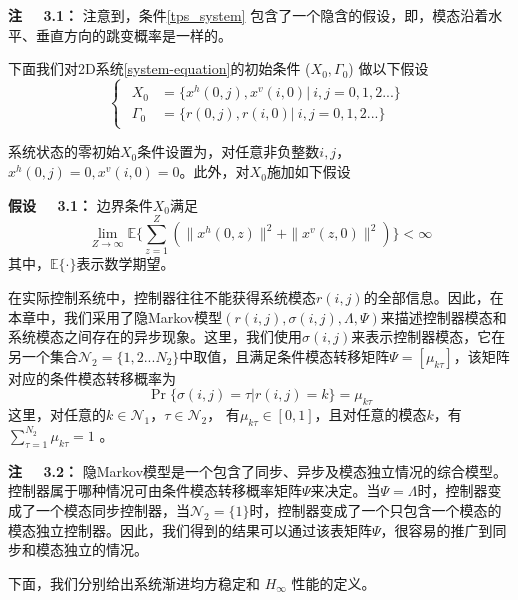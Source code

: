 	{\bf 注 \ \ 3.1：}
	注意到，条件\eqref{tps_system} 包含了一个隐含的假设，即，模态沿着水平、垂直方向的跳变概率是一样的。
	
	下面我们对2D系统\eqref{system-equation}的初始条件 ($X_{0},\varGamma_{0}$) 做以下假设
	\begin{equation} \label{boundary-condition}
	\left\{
	\begin{array}{lr}
	\begin{split}
	X_{0} &= \{x^{h}(0,j),x^{v}(i,0)|\ i,j = 0,1,2...\}\\
	\varGamma_{0} &= \{r(0,j), r(i,0)|\ i,j = 0,1,2... \}
	\end{split}
	\end{array}
	\right.
	\end{equation}
	
	系统状态的零初始$X_0$条件设置为，对任意非负整数$i,j$，$x^{h}(0,j) =0, x^{v}(i,0)=0$。此外，对$X_{0}$施加如下假设
	
	{\bf 假设 \ \ 3.1：}
	边界条件$X_{0}$满足
	\begin{equation}
	\lim\limits_{Z\to\infty}\mathbb{E}\Big\{\sum_{z=1}^{Z}(\|x^{h}(0,z)\|^{2}+ \|x^{v}(z,0)\|^{2})\Big\} < \infty
	\end{equation}
	其中，$\mathbb{E}\{\cdot\}$表示数学期望。
	
	在实际控制系统中，控制器往往不能获得系统模态$r(i,j)$的全部信息。因此，在本章中，我们采用了隐Markov模型$(r(i,j),\sigma(i,j),\varLambda,\varPsi)$来描述控制器模态和系统模态之间存在的异步现象。这里，我们使用$\sigma(i,j)$来表示控制器模态，它在另一个集合$\mathcal{N}_{2} = \{1,2...N_{2}\}$中取值，且满足条件模态转移矩阵$\varPsi=[\mu_{k\tau} ]$，该矩阵对应的条件模态转移概率为
	\begin{equation}
	\Pr\{\sigma(i,j)=\tau|r(i,j)=k\}=\mu_{k\tau } %
	\end{equation}
	这里，对任意的$k\in\mathcal{N}_{1}$，$\tau\in\mathcal{N}_{2}$， 有$\mu_{k\tau }\in[0,1]$，且对任意的模态$k$，有 $\sum_{\tau =1}^{N_{2}}\mu_{k\tau } = 1$ 。
	
	{\bf 注 \ \ 3.2：}
	隐Markov模型是一个包含了同步、异步及模态独立情况的综合模型。控制器属于哪种情况可由条件模态转移概率矩阵$\varPsi$来决定。当$\varPsi=\varLambda$时，控制器变成了一个模态同步控制器，当$\mathcal{N}_{2}=\{1\}$时，控制器变成了一个只包含一个模态的模态独立控制器。因此，我们得到的结果可以通过该表矩阵$\varPsi$，很容易的推广到同步和模态独立的情况。
	
	下面，我们分别给出系统渐进均方稳定和 $H_{\infty}$ 性能的定义。	
	
